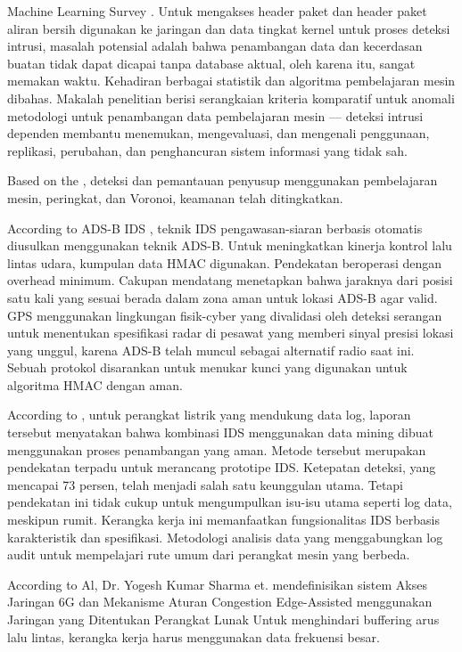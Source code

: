 \documentclass[conference]{IEEEtran}
\begin{document}
Machine Learning Survey \cite{buczak2015survey}. Untuk mengakses header paket dan header paket aliran bersih digunakan ke jaringan dan data tingkat kernel untuk proses deteksi intrusi, masalah potensial adalah bahwa penambangan data dan kecerdasan buatan tidak dapat dicapai tanpa database aktual, oleh karena itu, sangat memakan waktu. Kehadiran berbagai statistik dan algoritma pembelajaran mesin dibahas. Makalah penelitian berisi serangkaian kriteria komparatif untuk anomali metodologi untuk penambangan data pembelajaran mesin — deteksi intrusi dependen membantu menemukan, mengevaluasi, dan mengenali penggunaan, replikasi, perubahan, dan penghancuran sistem informasi yang tidak sah.

Based on the \cite{koli2017advanced}, deteksi dan pemantauan penyusup menggunakan pembelajaran mesin, peringkat, dan Voronoi, keamanan telah ditingkatkan.

According to ADS-B IDS \cite{kacem2016ads}, teknik IDS pengawasan-siaran berbasis otomatis diusulkan menggunakan teknik ADS-B. Untuk meningkatkan kinerja kontrol lalu lintas udara, kumpulan data HMAC digunakan. Pendekatan beroperasi dengan overhead minimum. Cakupan mendatang menetapkan bahwa jaraknya dari posisi satu kali yang sesuai berada dalam zona aman untuk lokasi ADS-B agar valid. GPS menggunakan lingkungan fisik-cyber yang divalidasi oleh deteksi serangan untuk menentukan spesifikasi radar di pesawat yang memberi sinyal presisi lokasi yang unggul, karena ADS-B telah muncul sebagai alternatif radio saat ini. Sebuah protokol disarankan untuk menukar kunci yang digunakan untuk algoritma HMAC dengan aman.

According to \cite{pan2015developing}, untuk perangkat listrik yang mendukung data log, laporan tersebut menyatakan bahwa kombinasi IDS menggunakan data mining dibuat menggunakan proses penambangan yang aman. Metode tersebut merupakan pendekatan terpadu untuk merancang prototipe IDS. Ketepatan deteksi, yang mencapai 73 persen, telah menjadi salah satu keunggulan utama. Tetapi pendekatan ini tidak cukup untuk mengumpulkan isu-isu utama seperti log data, meskipun rumit. Kerangka kerja ini memanfaatkan fungsionalitas IDS berbasis karakteristik dan spesifikasi. Metodologi analisis data yang menggabungkan log audit untuk mempelajari rute umum dari perangkat mesin yang berbeda.\nocite{ezzarii2016epigenetic}

According to Al, Dr. Yogesh Kumar Sharma et. \cite{borole20206g} mendefinisikan sistem Akses Jaringan 6G dan Mekanisme Aturan Congestion Edge-Assisted menggunakan Jaringan yang Ditentukan Perangkat Lunak Untuk menghindari buffering arus lalu lintas, kerangka kerja harus menggunakan data frekuensi besar.
\end{document}
